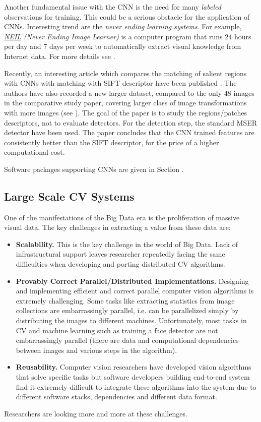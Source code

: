 Another fundamental issue with the CNN is the need for many {\em labeled} observations for training. This could be a serious obstacle for the application of CNNs. Interesting trend are the {\em never ending learning systems}. For example, \href{http://www.neil-kb.com/}{\em \underline{NEIL}} {\em (Never Ending Image Learner)} is a computer program that runs $24$ hours per day and $7$ days per week to automatically extract visual knowledge from Internet data. For more details see \cite{Chen_2013_ICCV}. 

Recently, an interesting article which compares the matching of salient regions with CNNs with matching with SIFT descriptor have been published \cite{FischerDB14}. The authors have also recorded a new larger dataset, compared to the only $48$ images in the comparative study paper, covering larger class of image transformations with more images (see ). The goal of the paper is to study the regions/patches descriptors, not to evaluate detectors. For the detection step, the standard MSER detector have been used. The paper concludes that the CNN trained features are consistently better than the SIFT descriptor, for the price of a higher computational cost.

Software packages supporting CNNs are given in Section .

\subsection{Large Scale CV Systems} \label{subsec:largescale}
One of the manifestations of the Big Data era is the proliferation of massive visual data. The key challenges in extracting a value from these data are:
\begin{itemize}
\item{ {\bf Scalability.} This is the key challenge in the world of Big Data. Lack of infrastructural support leaves researcher repeatedly facing the same difficulties when developing and porting  distributed CV algorithms.}
\item{{\bf Provably Correct Parallel/Distributed Implementations.} Designing and implementing
efficient and correct parallel computer vision algorithms is extremely challenging. Some tasks like extracting statistics from image collections are embarrassingly parallel, i.e. can be parallelized simply by distributing
the images to different machines. Unfortunately, most tasks in CV and
machine learning such as training a face detector are not embarrassingly parallel
(there are data and computational dependencies between images and various
steps in the algorithm).}
\item{{\bf Reusability.} Computer vision researchers have developed vision algorithms
that solve specific tasks but software developers building end-to-end system
find it extremely difficult to integrate these algorithms into the system due to
different software stacks, dependencies and different data format.}
\end{itemize}
Researchers are looking more and more at these challenges.

